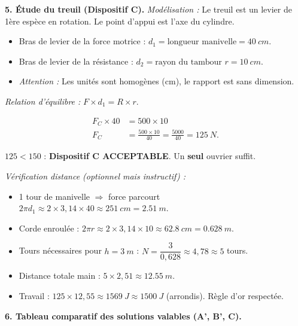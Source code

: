 \documentclass[11pt]{article}
\begin{document}
\begin{exoresolu}
\textbf{5. Étude du treuil (Dispositif C).}
\emph{Modélisation :} Le treuil est un levier de 1ère espèce en rotation. Le point d'appui est l'axe du cylindre.
\begin{itemize}
\item Bras de levier de la force motrice : $d_1 = \text{longueur manivelle} = \SI{40}{cm}$.
\item Bras de levier de la résistance : $d_2 = \text{rayon du tambour } r = \SI{10}{cm}$.
\item \emph{Attention :} Les unités sont homogènes (cm), le rapport est sans dimension.
\end{itemize}

\emph{Relation d'équilibre :} $F \times d_1 = R \times r$.

\begin{align*}
F_C \times 40 &= 500 \times 10 \\
F_C &= \frac{500 \times 10}{40} = \frac{5000}{40} = \SI{125}{N}.
\end{align*}

$125 < 150$ : \textbf{Dispositif C ACCEPTABLE}. Un \textbf{seul} ouvrier suffit.

\emph{Vérification distance (optionnel mais instructif) :}
\begin{itemize}
\item 1 tour de manivelle $\Rightarrow$ force parcourt $2\pi d_1 \approx 2 \times 3,14 \times 40 \approx \SI{251}{cm} = \SI{2,51}{m}$.
\item Corde enroulée : $2\pi r \approx 2 \times 3,14 \times 10 \approx \SI{62,8}{cm} = \SI{0,628}{m}$.
\item Tours nécessaires pour $h = \SI{3}{m}$ : $N = \dfrac{3}{0,628} \approx 4,78 \approx 5$ tours.
\item Distance totale main : $5 \times 2,51 \approx \SI{12,55}{m}$.
\item Travail : $125 \times 12,55 \approx \SI{1569}{J} \approx \SI{1500}{J}$ (arrondis). Règle d'or respectée.
\end{itemize}

\textbf{6. Tableau comparatif des solutions valables (A', B', C).}


\end{exoresolu}
\end{document}
